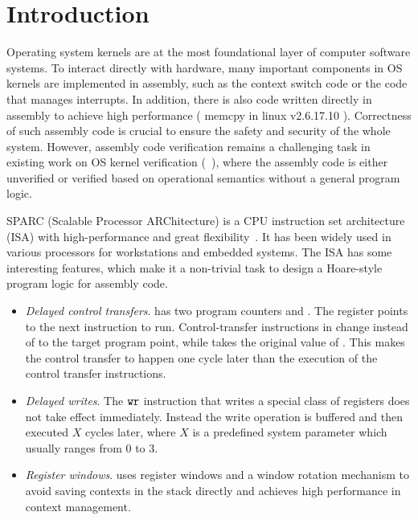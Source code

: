 \section{Introduction}

Operating system kernels are at
the most foundational layer of computer software systems.
To interact directly with hardware,
many important components in OS kernels are implemented
in assembly, such as the context switch code or the code that
manages interrupts. 
In addition, there is also code written directly in assembly
to achieve high performance (\eg{} \textsf{memcpy} in linux 
v2.6.17.10 \cite{linuxv2.6.17.10}).
Correctness of such assembly code is crucial to ensure
the safety and security of the whole system.
However, assembly code verification remains a challenging
task in existing work on OS kernel verification
(\eg~\cite{Xu16cav, sel4, deepspec}),
where the assembly code is either unverified or verified based on
operational semantics without a general program logic.

SPARC (Scalable Processor ARChitecture)
is a CPU instruction set architecture (ISA) with high-performance
and great flexibility~\cite{sparc}.
It has been widely used in various processors
for workstations and embedded systems. %
The \sparc{} ISA has some interesting features, which
make it a non-trivial task to design a Hoare-style
program logic for assembly code.

\begin{itemize}
	\item \textit{Delayed control transfers}.
	\sparc{} has two program counters \pc{} and \npc.
    The \npc{} register points to the next instruction
    to run.
	Control-transfer instructions in \sparc{}
	change \npc{} instead of \pc{} to the target program point,
    while \pc{} takes the original value of \npc.
	This makes the control transfer to happen one cycle later
    than the execution of the control transfer instructions.
	
	\item \textit{Delayed writes}.
	The $\texttt{wr}$ instruction that writes a special class
    of registers
    does not take effect immediately.
    Instead the write operation is buffered
    and then executed $X$ cycles later, where $X$ is a
    predefined
    system parameter which usually ranges from 0 to 3.
	\item \textit{Register windows}.
	\sparc{} uses register windows
	and a window rotation mechanism
	to avoid saving contexts in the stack directly
	and achieves high performance in context management.
\end{itemize}

